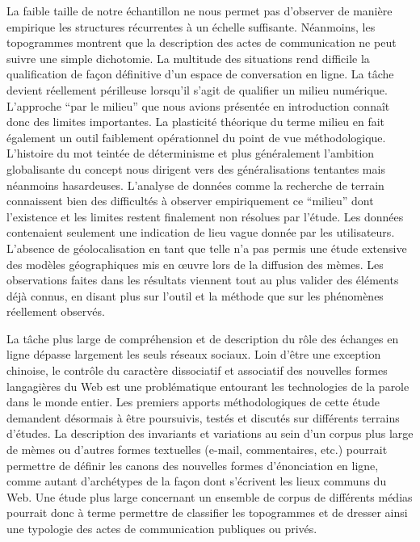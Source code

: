 La faible taille de notre échantillon ne nous permet pas d{\textquoteright}observer de manière empirique les structures récurrentes à un échelle suffisante. Néanmoins, les topogrammes montrent que la description des actes de communication ne peut suivre une simple dichotomie. La multitude des situations rend difficile la qualification de fa\c{c}on définitive d'un espace de conversation en ligne. La tâche devient réellement périlleuse lorsqu'il s'agit de qualifier un milieu numérique. L'approche ``par le milieu'' que nous avions présentée en introduction connaît donc des limites importantes. La plasticité théorique du terme milieu en fait également un outil faiblement opérationnel du point de vue méthodologique. L'histoire du mot teintée de déterminisme et plus généralement l'ambition globalisante du concept nous dirigent vers des généralisations tentantes mais néanmoins hasardeuses. L'analyse de données comme la recherche de terrain connaissent bien des difficultés à observer empiriquement ce ``milieu'' dont l'existence et les limites restent finalement non résolues par l'étude. Les données contenaient seulement une indication de lieu vague donnée par les utilisateurs. L'absence de géolocalisation en tant que telle n'a pas permis une étude extensive des modèles géographiques mis en œuvre lors de la diffusion des mèmes. Les observations faites dans les résultats viennent tout au plus valider des éléments déjà connus, en disant plus sur l'outil et la méthode que sur les phénomènes réellement observés. 


La t\^ache plus large de compréhension et de description du r\^ole des échanges en ligne dépasse largement les seuls réseaux sociaux. Loin d{\textquoteright}être une exception chinoise, le contr\^ole du caractère dissociatif et associatif des nouvelles formes langagières du Web est une problématique entourant les technologies de la parole dans le monde entier. Les premiers apports méthodologiques de cette étude demandent désormais à être poursuivis, testés et discutés sur différents terrains d{\textquoteright}études. La description des invariants et variations au sein d{\textquoteright}un corpus plus large de mèmes ou d{\textquoteright}autres formes textuelles (e-mail, commentaires, etc.) pourrait permettre de définir les canons des nouvelles formes d{\textquoteright}énonciation en ligne, comme autant d{\textquoteright}archétypes de la fa\c{c}on dont s{\textquoteright}écrivent les lieux communs du Web. Une étude plus large concernant un ensemble de corpus de différents médias pourrait donc à terme permettre de classifier les topogrammes et de dresser ainsi une typologie des actes de communication publiques ou privés. 

